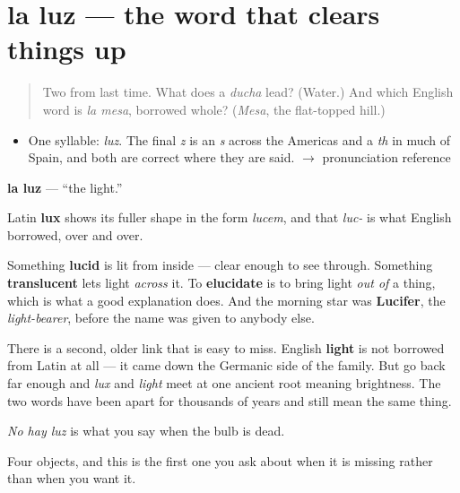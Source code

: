 \section[la luz]{la luz — the word that clears things up}

\label{lesson:ES-C310-luz}



\begin{quote}
Two from last time. What does a \emph{ducha} lead? (Water.) And which English word is \emph{la mesa}, borrowed whole? (\emph{Mesa}, the flat-topped hill.)
\end{quote}

\begin{sounds}
\begin{itemize}
\raggedright
  \item One syllable: \emph{luz}. The final \emph{z} is an \emph{s} across the Americas and a \emph{th} in much of Spain, and both are correct where they are said. $\to$ pronunciation reference
\end{itemize}
\end{sounds}

\begin{cousinweb}
\textbf{la luz} — \textquotedblleft{}the light.\textquotedblright{}

Latin \textbf{lux} shows its fuller shape in the form \emph{lucem}, and that \emph{luc-} is what English borrowed, over and over.

Something \textbf{lucid} is lit from inside — clear enough to see through. Something \textbf{translucent} lets light \emph{across} it. To \textbf{elucidate} is to bring light \emph{out of} a thing, which is what a good explanation does. And the morning star was \textbf{Lucifer}, the \emph{light-bearer}, before the name was given to anybody else.

There is a second, older link that is easy to miss. English \textbf{light} is not borrowed from Latin at all — it came down the Germanic side of the family. But go back far enough and \emph{lux} and \emph{light} meet at one ancient root meaning brightness. The two words have been apart for thousands of years and still mean the same thing.

\emph{No hay luz} is what you say when the bulb is dead.
\end{cousinweb}

\begin{grammarlens}[title={What you've built}]
Four objects, and this is the first one you ask about when it is missing rather than when you want it.
\end{grammarlens}

